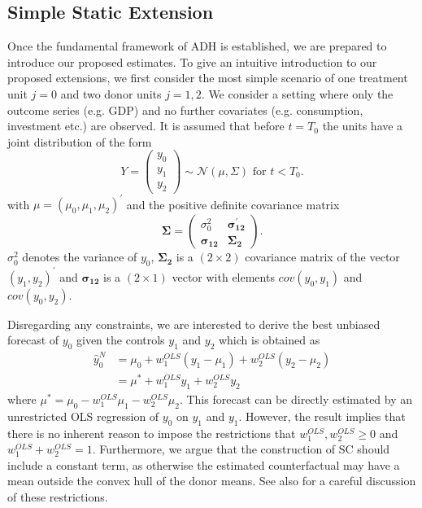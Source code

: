 \subsection{Simple Static Extension}
Once the fundamental framework of \ac{ADH} is established, we are prepared to introduce our proposed estimates. To give an intuitive introduction to our proposed extensions, we first consider the most simple scenario of one treatment unit $j = 0$ and two donor units $j = 1,2$. We consider a setting where only the outcome series (e.g. \ac{GDP}) and no further covariates (e.g. consumption, investment etc.) are observed. It is assumed that before $t = T_0$ the units have a joint distribution of the form 
\[
Y = \begin{pmatrix} y_0\\ y_1\\ y_2 \end{pmatrix} \sim \mathcal{N}(\mu,\Sigma)
\text{ for } t<T_0.
\] 
with $\mu = \left(\mu_0, \mu_1, \mu_2  \right)^\prime$ and the positive definite covariance matrix
\[
\boldsymbol{\Sigma} = \begin{pmatrix} \sigma_0^2 & \boldsymbol{\sigma_{12}^\prime} \\
	\boldsymbol{\sigma_{12}} & \boldsymbol{\Sigma_2} \end{pmatrix}.
\] 
$\sigma_0^2$ denotes the variance of $y_0$, $\boldsymbol{\Sigma_2}$ is a $(2 \times 2)$ covariance matrix of the vector $(y_1, y_2)^\prime$ and $\boldsymbol{\sigma_{12}}$ is a $(2 \times 1)$ vector with elements $cov(y_0, y_1)$ and $cov(y_0, y_2)$.

Disregarding any constraints, we are interested to derive the best unbiased forecast of $y_0$ given the controls $y_1$ and $y_2$ which is obtained as
\begin{equation*}
	\begin{split}
		\widehat{y}^{N}_{0} & = \mu_0 + w_1^{OLS} (y_1 - \mu_1) + w_2^{OLS} (y_2 - \mu_2) \\
		& = \mu^* + w_1^{OLS} y_1 + w_2^{OLS} y_2
	\end{split}
\end{equation*}
where $\mu^* = \mu_0 - w_1^{OLS} \mu_1 - w_2^{OLS} \mu_2$. This forecast can be directly estimated by an unrestricted \ac{OLS} regression of $y_0$ on $y_1$ and $y_1$. However, the result implies that there is no inherent reason to impose the restrictions that $w_1^{OLS}, w_2^{OLS} \geq 0$ and $w_1^{OLS} + w_2^{OLS} = 1$. Furthermore, we argue that the construction of \ac{SC} should include a constant term, as otherwise the estimated counterfactual may have a mean outside the convex hull of the donor means. See also \cite{doudchenko:2016} for a careful discussion of these restrictions. 

